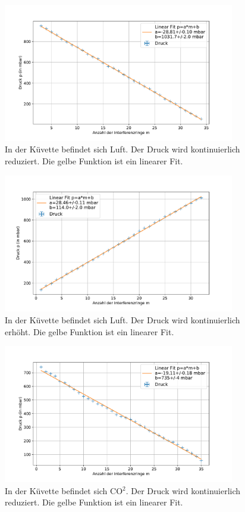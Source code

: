 \documentclass[
	a4paper,
	12pt,
	pagesize,
	ngerman
]{scrartcl}
\begin{document}
\begin{figure}[H]
		\includegraphics[width=0.9\textwidth]{images/Luft_Raus.pdf}
		\centering
		\caption{In der Küvette befindet sich Luft. Der Druck wird kontinuierlich reduziert. Die gelbe Funktion ist ein linearer Fit.}
		\label{fig_luft_raus}
	\end{figure}
\begin{figure}[H]
		\includegraphics[width=0.9\textwidth]{images/Luft_Rein.pdf}
		\centering
		\caption{In der Küvette befindet sich Luft. Der Druck wird kontinuierlich erhöht. Die gelbe Funktion ist ein linearer Fit.}
		\label{fig_luft_rein}
	\end{figure}
\begin{figure}[H]
		\includegraphics[width=0.9\textwidth]{images/CO2_Raus.pdf}
		\centering
		\caption{In der Küvette befindet sich CO$^2$. Der Druck wird kontinuierlich reduziert. Die gelbe Funktion ist ein linearer Fit.}
		\label{fig_co2_raus}
	\end{figure}
\end{document}
